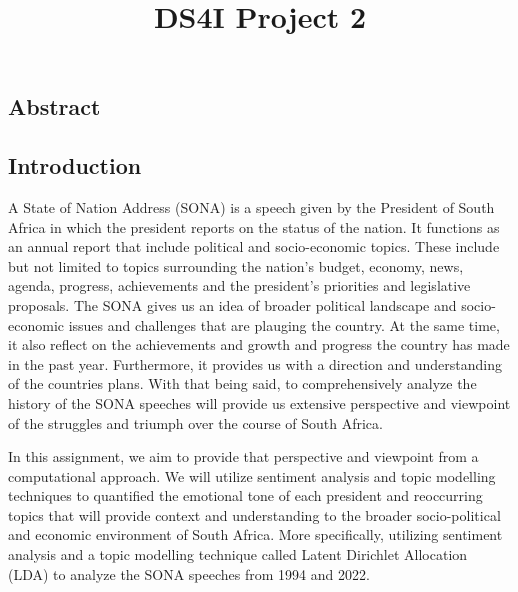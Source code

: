 \documentclass[
  letterpaper,
  DIV=11,
  numbers=noendperiod]{scrartcl}
\title{DS4I Project 2}
\author{}
\date{}
\renewcommand*\contentsname{Table of contents}
\newcommand\contentsname{Table of contents}
\begin{document}
\maketitle
\ifdefined\Shaded\renewenvironment{Shaded}{\begin{tcolorbox}[borderline west={3pt}{0pt}{shadecolor}, frame hidden, breakable, interior hidden, enhanced, sharp corners, boxrule=0pt]}{\end{tcolorbox}}\fi

\renewcommand*\contentsname{Table of contents}
{
\hypersetup{linkcolor=}
\setcounter{tocdepth}{3}
\tableofcontents
}
\hypertarget{abstract}{%
\subsection{Abstract}\label{abstract}}

\hypertarget{introduction}{%
\subsection{Introduction}\label{introduction}}

A State of Nation Address (SONA) is a speech given by the President of
South Africa in which the president reports on the status of the nation.
It functions as an annual report that include political and
socio-economic topics. These include but not limited to topics
surrounding the nation's budget, economy, news, agenda, progress,
achievements and the president's priorities and legislative proposals.
The SONA gives us an idea of broader political landscape and
socio-economic issues and challenges that are plauging the country. At
the same time, it also reflect on the achievements and growth and
progress the country has made in the past year. Furthermore, it provides
us with a direction and understanding of the countries plans. With that
being said, to comprehensively analyze the history of the SONA speeches
will provide us extensive perspective and viewpoint of the struggles and
triumph over the course of South Africa.

In this assignment, we aim to provide that perspective and viewpoint
from a computational approach. We will utilize sentiment analysis and
topic modelling techniques to quantified the emotional tone of each
president and reoccurring topics that will provide context and
understanding to the broader socio-political and economic environment of
South Africa. More specifically, utilizing sentiment analysis and a
topic modelling technique called Latent Dirichlet Allocation (LDA) to
analyze the SONA speeches from 1994 and 2022.
\end{document}
